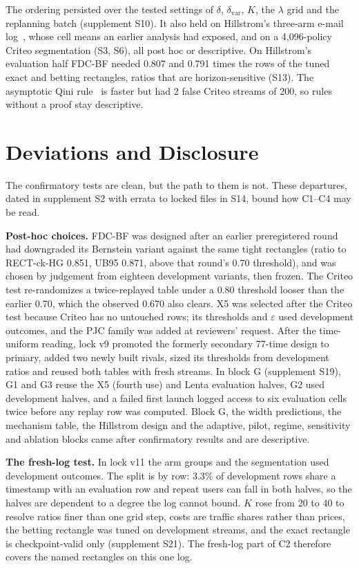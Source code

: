 \documentclass[sigconf,anonymous,review]{acmart}
\newcommand{\eps}{\varepsilon}
\newcommand{\dvar}{\delta_{\text{var}}}
\begin{document}
The ordering persisted over the tested settings of $\delta$, $\dvar$, $K$, the $\lambda$ grid and the replanning batch (supplement S10). It also held on Hillstrom's three-arm e-mail log~\citep{hillstrom2008minethatdata}, whose cell means an earlier analysis had exposed, and on a 4,096-policy Criteo segmentation (S3, S6), all post hoc or descriptive. On Hillstrom's evaluation half FDC-BF needed 0.807 and 0.791 times the rows of the tuned exact and betting rectangles, ratios that are horizon-sensitive (S13). The asymptotic Qini rule~\citep{sverdrup2023qini} is faster but had 2 false Criteo streams of 200, so rules without a proof stay descriptive.

\section{Deviations and Disclosure}\label{sec:deviations}

The confirmatory tests are clean, but the path to them is not. These departures, dated in supplement S2 with errata to locked files in S14, bound how C1--C4 may be read.

\textbf{Post-hoc choices.} FDC-BF was designed after an earlier preregistered round had downgraded its Bernstein variant against the same tight rectangles (ratio to RECT-ck-HG 0.851, UB95 0.871, above that round's 0.70 threshold), and was chosen by judgement from eighteen development variants, then frozen. The Criteo test re-randomizes a twice-replayed table under a 0.80 threshold looser than the earlier 0.70, which the observed 0.670 also clears. X5 was selected after the Criteo test because Criteo has no untouched rows; its thresholds and $\eps$ used development outcomes, and the PJC family was added at reviewers' request. After the time-uniform reading, lock v9 promoted the formerly secondary 77-time design to primary, added two newly built rivals, sized its thresholds from development ratios and reused both tables with fresh streams. In block G (supplement S19), G1 and G3 reuse the X5 (fourth use) and Lenta evaluation halves, G2 used development halves, and a failed first launch logged access to six evaluation cells twice before any replay row was computed. Block G, the width predictions, the mechanism table, the Hillstrom design and the adaptive, pilot, regime, sensitivity and ablation blocks came after confirmatory results and are descriptive.

\textbf{The fresh-log test.} In lock v11 the arm groups and the segmentation used development outcomes. The split is by row: 3.3\% of development rows share a timestamp with an evaluation row and repeat users can fall in both halves, so the halves are dependent to a degree the log cannot bound. $K$ rose from 20 to 40 to resolve ratios finer than one grid step, costs are traffic shares rather than prices, the betting rectangle was tuned on development streams, and the exact rectangle is checkpoint-valid only (supplement S21). The fresh-log part of C2 therefore covers the named rectangles on this one log.
\end{document}
